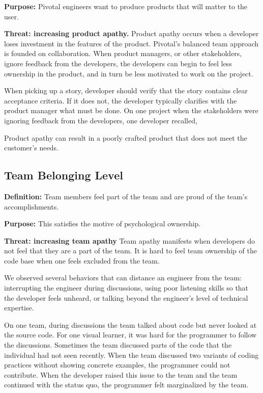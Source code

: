 \textbf{Purpose:} Pivotal engineers want to produce products that will matter to the user. 

\textbf{Threat: increasing product apathy.} Product apathy occurs when a developer loses investment in the features of the product. Pivotal’s balanced team approach is founded on collaboration. When product managers, or other stakeholders, ignore feedback from the developers, the developers can begin to feel less ownership in the product, and in turn be less motivated to work on the project.

When picking up a story, developer should verify that the story contains clear acceptance criteria. If it does not, the developer typically clarifies with the product manager what must be done. On one project when the stakeholders were ignoring feedback from the developers, one developer recalled,  


Product apathy can result in a poorly crafted product that does not meet the customer’s needs.

\subsection{Team Belonging Level}
\textbf{Definition:} Team members feel part of the team and are proud of the team’s accomplishments.

\textbf{Purpose:} This satisfies the  motive of psychological ownership.

\textbf{Threat: increasing team apathy}
Team apathy manifests when developers do not feel that they are a part of the team. It is hard to feel team ownership of the code base when one feels excluded from the team.

We observed several behaviors that can distance an engineer from the team: interrupting the engineer during discussions, using poor listening skills so that the developer feels unheard, or talking beyond the engineer’s level of technical expertise. 

On one team, during discussions the team talked about code but never looked at the source code. For one visual learner, it was hard for the programmer to follow the discussions. Sometimes the team discussed parts of the code that the individual had not seen recently. When the team discussed two variants of coding practices without showing concrete examples, the programmer could not contribute. When the developer raised this issue to the team and the team continued with the status quo, the programmer felt marginalized by the team.

